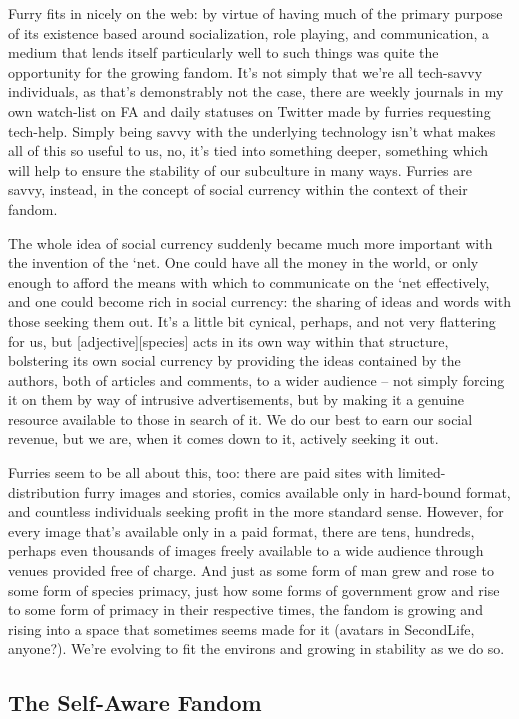 Furry fits in nicely on the web: by virtue of having much of the primary purpose of its existence based around socialization, role playing, and communication, a medium that lends itself particularly well to such things was quite the opportunity for the growing fandom.  It's not simply that we're all tech-savvy individuals, as that's demonstrably not the case, there are weekly journals in my own watch-list on FA and daily statuses on Twitter made by furries requesting tech-help.  Simply being savvy with the underlying technology isn't what makes all of this so useful to us, no, it's tied into something deeper, something which will help to ensure the stability of our subculture in many ways.  Furries are savvy, instead, in the concept of social currency within the context of their fandom.

The whole idea of social currency suddenly became much more important with the invention of the `net.  One could have all the money in the world, or only enough to afford the means with which to communicate on the `net effectively, and one could become rich in social currency: the sharing of ideas and words with those seeking them out.  It's a little bit cynical, perhaps, and not very flattering for us, but [adjective][species] acts in its own way within that structure, bolstering its own social currency by providing the ideas contained by the authors, both of articles and comments, to a wider audience -- not simply forcing it on them by way of intrusive advertisements, but by making it a genuine resource available to those in search of it.  We do our best to earn our social revenue, but we are, when it comes down to it, actively seeking it out.

Furries seem to be all about this, too: there are paid sites with limited-distribution furry images and stories, comics available only in hard-bound format, and countless individuals seeking profit in the more standard sense.  However, for every image that's available only in a paid format, there are tens, hundreds, perhaps even thousands of images freely available to a wide audience through venues provided free of charge.  And just as some form of man grew and rose to some form of species primacy, just how some forms of government grow and rise to some form of primacy in their respective times, the fandom is growing and rising into a space that sometimes seems made for it (avatars in SecondLife, anyone?).  We're evolving to fit the environs and growing in stability as we do so.

\subsection*{The Self-Aware Fandom}

